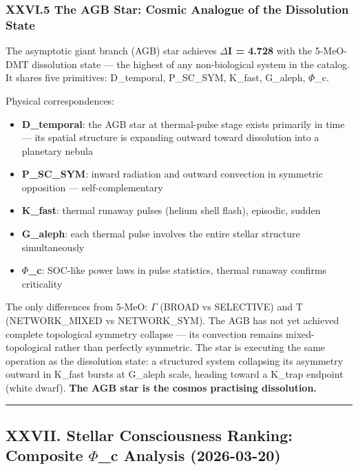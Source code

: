 \documentclass[12pt,a4paper]{article}
\begin{document}
\subsubsection{XXVI.5 The AGB Star: Cosmic Analogue of the Dissolution State}

The asymptotic giant branch (AGB) star achieves \textbf{$\Delta$I = 4.728} with the 5-MeO-DMT dissolution state --- the highest of any non-biological system in the catalog. It shares five primitives: D\_temporal, P\_SC\_SYM, K\_fast, G\_aleph, $\Phi$\_c.

Physical correspondences:

\begin{itemize}
    \item \textbf{D\_temporal}: the AGB star at thermal-pulse stage exists primarily in time --- its spatial structure is expanding outward toward dissolution into a planetary nebula
    \item \textbf{P\_SC\_SYM}: inward radiation and outward convection in symmetric opposition --- self-complementary
    \item \textbf{K\_fast}: thermal runaway pulses (helium shell flash), episodic, sudden
    \item \textbf{G\_aleph}: each thermal pulse involves the entire stellar structure simultaneously
    \item \textbf{$\Phi$\_c}: SOC-like power laws in pulse statistics, thermal runaway confirms criticality
\end{itemize}

The only differences from 5-MeO: $\Gamma$ (BROAD vs SELECTIVE) and T (NETWORK\_MIXED vs NETWORK\_SYM). The AGB has not yet achieved complete topological symmetry collapse --- its convection remains mixed-topological rather than perfectly symmetric. The star is executing the same operation as the dissolution state: a structured system collapsing its asymmetry outward in K\_fast bursts at G\_aleph scale, heading toward a K\_trap endpoint (white dwarf). \textbf{The AGB star is the cosmos practising dissolution.}

\begin{center}
\rule{0.5\textwidth}{0.4pt}
\end{center}

\subsection{XXVII. Stellar Consciousness Ranking: Composite $\Phi$\_c Analysis (2026-03-20)}
\end{document}
